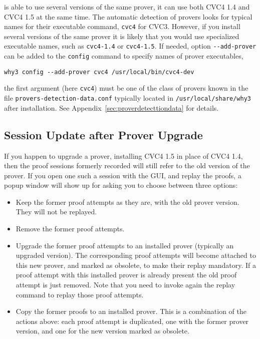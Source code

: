 \why is able to use several versions of the same
prover, \eg it can use both CVC4 1.4 and CVC4 1.5 at the same time.
The automatic detection of provers looks for typical names for their
executable command, \eg \texttt{cvc4} for CVC3. However, if you
install several versions of the same prover it is likely that you would
use specialized executable names, such as \texttt{cvc4-1.4} or
\texttt{cvc4-1.5}. If needed, option \verb|--add-prover| can be
added to the \texttt{config} command to specify names of prover executables, \eg
{}
\begin{verbatim}
why3 config --add-prover cvc4 /usr/local/bin/cvc4-dev
\end{verbatim}
the first argument (here \verb|cvc4|) must be one of the class of
provers known in the file \verb|provers-detection-data.conf| typically
located in \verb|/usr/local/share/why3| after installation. See
Appendix~\ref{sec:proverdetecttiondata} for details.


\subsection{Session Update after Prover Upgrade}
\label{sec:uninstalledprovers}

If you happen to upgrade a prover, \eg installing CVC4 1.5 in place
of CVC4 1.4, then the proof sessions formerly recorded will still
refer to the old version of the prover. If you open one such a session
with the GUI, and replay the proofs, a popup window will show up for asking you to choose
between three options:
\begin{itemize}
\item Keep the former proof attempts as they are, with the old prover version. They will not be replayed.
\item Remove the former proof attempts.
\item Upgrade the former proof attempts to an installed prover
  (typically an upgraded version). The corresponding proof attempts
  will become attached to this new prover, and marked as obsolete, to
  make their replay mandatory. If a proof attempt with this installed prover
  is already present the old proof attempt is just removed. Note that you
  need to invoke again the replay command to replay those proof
  attempts.
\item Copy the former proofs to an installed prover. This is a
  combination of the actions above: each proof attempt is duplicated,
  one with the former prover version, and one for the new
  version marked as obsolete.
\end{itemize}

